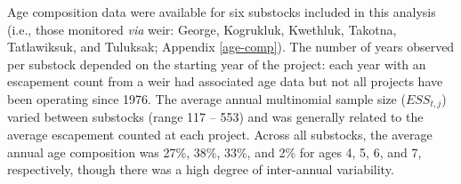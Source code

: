 \documentclass[12pt,]{book}
\theoremstyle{definition}
\theoremstyle{definition}
\theoremstyle{definition}
\theoremstyle{remark}
\begin{document}
\noindent
Age composition data were available for six substocks included in this
analysis (i.e., those monitored \emph{via} weir: George, Kogrukluk,
Kwethluk, Takotna, Tatlawiksuk, and Tuluksak; Appendix \ref{age-comp}).
The number of years observed per substock depended on the starting year
of the project: each year with an escapement count from a weir had
associated age data but not all projects have been operating since 1976.
The average annual multinomial sample size (\(ESS_{t,j}\)) varied
between substocks (range 117 -- 553) and was generally related to the
average escapement counted at each project. Across all substocks, the
average annual age composition was 27\%, 38\%, 33\%, and 2\% for ages 4,
5, 6, and 7, respectively, though there was a high degree of
inter-annual variability.

\clearpage

\singlespacing
\end{document}
